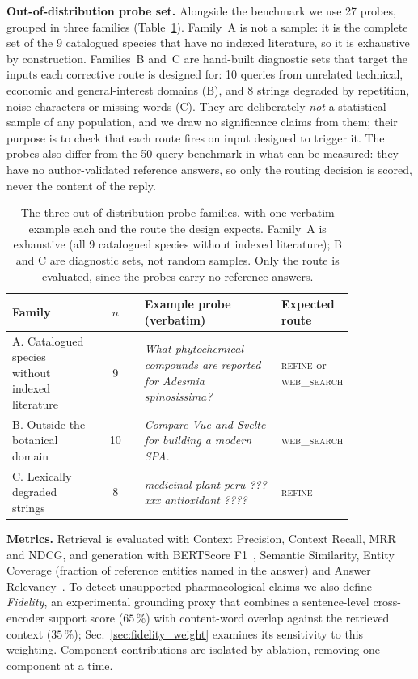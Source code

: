 \documentclass[runningheads]{llncs}
\begin{document}
\textbf{Out-of-distribution probe set.} Alongside the benchmark we use 27 probes,
grouped in three families (Table~\ref{tab:probe_families}). Family~A is not a sample: it
is the complete set of the 9 catalogued species that have no indexed literature, so it is
exhaustive by construction. Families~B and~C are hand-built diagnostic sets that target
the inputs each corrective route is designed for: 10 queries from unrelated technical,
economic and general-interest domains (B), and 8 strings degraded by repetition, noise
characters or missing words (C). They are deliberately \emph{not} a statistical sample of
any population, and we draw no significance claims from them; their purpose is to check
that each route fires on input designed to trigger it. The probes also differ from the
50-query benchmark in what can be measured: they have no author-validated reference
answers, so only the routing decision is scored, never the content of the reply.

\begin{table}[!ht]
\centering
\caption{The three out-of-distribution probe families, with one verbatim example each and
the route the design expects. Family~A is exhaustive (all 9 catalogued species without
indexed literature); B and C are diagnostic sets, not random samples. Only the route is
evaluated, since the probes carry no reference answers.}
\label{tab:probe_families}
\footnotesize
\setlength{\tabcolsep}{4pt}
\begin{tabular}{>{\raggedright\arraybackslash}p{0.25\linewidth} c >{\raggedright\arraybackslash}p{0.40\linewidth} >{\raggedright\arraybackslash}p{0.19\linewidth}}
\toprule
\textbf{Family} & $n$ & \textbf{Example probe (verbatim)} & \textbf{Expected route} \\
\midrule
A. Catalogued species without indexed literature & 9 & \emph{What phytochemical compounds are reported for Adesmia spinosissima?} & \textsc{refine} or \textsc{web\_search} \\
\addlinespace
B. Outside the botanical domain & 10 & \emph{Compare Vue and Svelte for building a modern SPA.} & \textsc{web\_search} \\
\addlinespace
C. Lexically degraded strings & 8 & \emph{medicinal plant peru ??? xxx antioxidant ????} & \textsc{refine} \\
\bottomrule
\end{tabular}
\end{table}

\textbf{Metrics.} Retrieval is evaluated with Context Precision, Context Recall, MRR and NDCG, and generation with BERTScore F1~\cite{zhang2020bertscore}, Semantic Similarity, Entity Coverage (fraction of reference entities named in the answer) and Answer Relevancy~\cite{es2023ragas}. To detect unsupported pharmacological claims we also define \emph{Fidelity}, an experimental grounding proxy that combines a sentence-level cross-encoder support score ($65\,\%$) with content-word overlap against the retrieved context ($35\,\%$); Sec.~\ref{sec:fidelity_weight} examines its sensitivity to this weighting. Component contributions are isolated by ablation, removing one component at a time.
\end{document}
